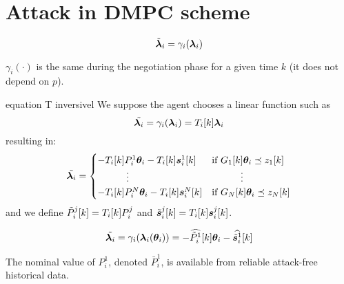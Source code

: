 \documentclass{ifacconf}  %
\begin{document}
\section{Attack in DMPC scheme}\label{sec:attack}

\begin{equation}\label{eq:cheating}
\tilde{\boldsymbol{\lambda}}_i=\gamma_{i}(\boldsymbol{\lambda}_i)
\end{equation}

\begin{assumption}
  $\gamma_{i}(\cdot)$ is the same during the negotiation phase for a given time $k$ (it does not depend on $p$).
\end{assumption}

\begin{assumption}
  equation
  T inversivel
  We suppose the agent chooses a linear function such as \[ {\tilde{\lambdai}=\gamma_{i}(\vec{\lambda}_{i})=\Tik\vec{\lambda}_{i}} \] resulting in:
  \begin{equation}
    \label{eq:linear_cheating}
    \tilde{\lambdai}=
        \begin{cases}
      -\Tik P_{i}^{1}\vec{\theta}_{i}-\Tik \vec{s}_{i}^{1}[k]&\text{if}\ G_{1}[k]\thetai \preceq z_{1}[k] \\
      \qquad\quad \vdots&\qquad\quad \vdots\\
      -\Tik P_{i}^{N}\vec{\theta}_{i}-\Tik \vec{s}_{i}^{N}[k]&\text{if}\ G_{N}[k]\thetai \preceq z_{N}[k] \\
    \end{cases}
  \end{equation}
and we define $\tilde{P}_{i}^{j}[k]=\Tik P_{i}^{j}$ and $\tilde{\vec{s}}_{i}^{j}[k]=\Tik\vec{s}_{i}^{j}[k]$.
\end{assumption}
\begin{equation}
  \label{eq:lambdafuntheta_tilde}
\tilde{\boldsymbol{\lambda}_i}=\gamma_{i}(\boldsymbol{\lambda}_i(\boldsymbol{\theta}_i))=-\widehat{\tilde{P}_{i}^{1}}[k]\boldsymbol{\theta}_{i}-\widehat{\tilde{\boldsymbol{s}}_{i}^{1}}[k]
\end{equation}


\begin{assumption}\label{ass:Pnominal}
  The nominal value of $P_{i}^{1}$, denoted $\bar{P}_{i}^{1}$, is available from reliable attack-free historical data.
\end{assumption}
\end{document}
